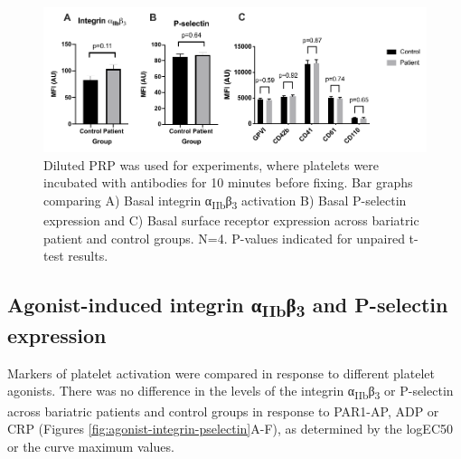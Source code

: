 \documentclass[11pt,twoside]{bristolthesis}
\begin{document}
\begin{figure}
\includegraphics[width=0.9\linewidth]{figure/Bariatric_study/Basal_surface_receptors} \caption[Comparison of basal integrin α\textsubscript{IIb}β\textsubscript{3} activation, P-selectin expression and surface receptors levels across control and bariatric patient groups]{Diluted PRP was used for experiments, where platelets were incubated with antibodies for 10 minutes before fixing. Bar graphs comparing A) Basal integrin α\textsubscript{IIb}β\textsubscript{3} activation B) Basal P-selectin expression and C) Basal surface receptor expression across bariatric patient and control groups. N=4. P-values indicated for unpaired t-test results.}\label{fig:basal-integrin-pselectin-receptor-bariatric}
\end{figure}
\hypertarget{agonist-induced-integrin-ux3b1iibux3b23-and-p-selectin-expression}{%
\subsection{\texorpdfstring{Agonist-induced integrin α\textsubscript{IIb}β\textsubscript{3} and P-selectin expression}{Agonist-induced integrin αIIbβ3 and P-selectin expression}}\label{agonist-induced-integrin-ux3b1iibux3b23-and-p-selectin-expression}}

Markers of platelet activation were compared in response to different platelet agonists. There was no difference in the levels of the integrin α\textsubscript{IIb}β\textsubscript{3} or P-selectin across bariatric patients and control groups in response to PAR1-AP, ADP or CRP (Figures \ref{fig:agonist-integrin-pselectin}A-F), as determined by the logEC50 or the curve maximum values.
\end{document}
